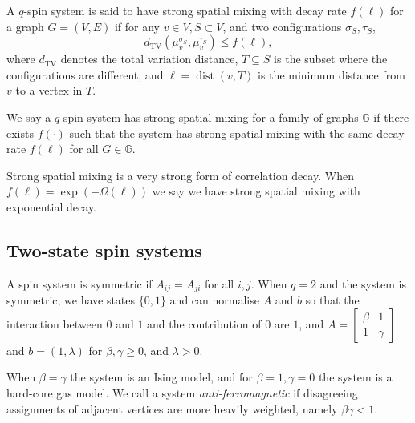 \documentclass{theoretics}
\newcommand{\dist}{\operatorname{dist}}
\newcommand{\dTV}{d_{\mathrm{TV}}}
\begin{document}
\begin{definition}[SSM]\label{def:SSM}
A $q$-spin system is said to have strong spatial mixing with decay rate $f(\ell)$ for a graph $G=(V,E)$ if for any $v\in V, S\subset V$, and two configurations $\sigma_S,\tau_S$,
\[\dTV(\mu_v^{\sigma_S},\mu_v^{\tau_S})\leq f(\ell),\]
where $\dTV$ denotes the total variation distance, $T\subseteq S$ is the subset where the configurations are different, and $\ell=\dist(v,T)$ is the minimum distance from $v$ to a vertex in $T$.

We say a $q$-spin system has strong spatial mixing for a family of graphs $\mathbb{G}$ if there exists $f(\cdot)$ such that the system has strong spatial mixing with the same decay rate $f(\ell)$ for all $G\in\mathbb{G}$. 
\end{definition}

Strong spatial mixing is a very strong form of correlation decay. When $f(\ell)=\exp(-\Omega(\ell))$ we say we have strong spatial mixing with exponential decay. 

\subsection{Two-state spin systems}

A spin system is symmetric if $A_{ij}=A_{ji}$ for all $i,j$. %
When $q=2$ and the system is symmetric, we have states $\{0,1\}$ and can normalise $A$ and $b$ so that the interaction between $0$ and $1$ and the contribution of $0$ are $1$, and $A=
\begin{bmatrix}
\beta & 1\\
1 & \gamma
\end{bmatrix}$ and $b=(1,\lambda)$ for $\beta,\gamma\geq0$, and $\lambda>0$. 

When $\beta=\gamma$ the system is an Ising model, and for $\beta=1, \gamma=0$ the system is a hard-core gas model. We call a system \emph{anti-ferromagnetic} if disagreeing assignments of adjacent vertices are more heavily weighted, namely $\beta\gamma<1$. 
\end{document}
